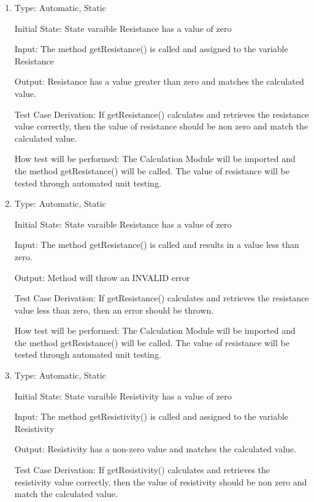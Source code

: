 \documentclass[12pt, titlepage]{article}
\begin{document}
\begin{enumerate}[{UT-C}1.]

  \item
  
  Type: Automatic, Static 

  Initial State: State varaible Resistance has a value of zero

  Input: The method getResistance() is called and assigned to the variable Resistance  

  Output: Resistance has a value greater than zero and matches the calculated value.

  Test Case Derivation: If getResistance() calculates and retrieves the resistance value correctly, then the value of resistance should be non zero and match the calculated value.

  How test will be performed: The Calculation Module will be imported and the method getResistance() will be called. 
  The value of resistance will be tested through automated unit testing.

  \item
  
  Type: Automatic, Static 

  Initial State: State varaible Resistance has a value of zero

  Input: The method getResistance() is called and results in a value less than zero.

  Output: Method will throw an INVALID error

  Test Case Derivation: If getResistance() calculates and retrieves the resistance value less than zero, then an error should be thrown.

  How test will be performed: The Calculation Module will be imported and the method getResistance() will be called. 
  The value of resistance will be tested through automated unit testing.
            
  \item
  
  Type: Automatic, Static 

  Initial State: State varaible Resistivity has a value of zero

  Input: The method getResistivity() is called and assigned to the variable Resistivity

  Output: Resistivity has a non-zero value and matches the calculated value. 

  Test Case Derivation: If getResistivity() calculates and retrieves the resistivity value correctly, then the value of resistivity should be non zero and match the calculated value.


\end{enumerate}
\end{document}

